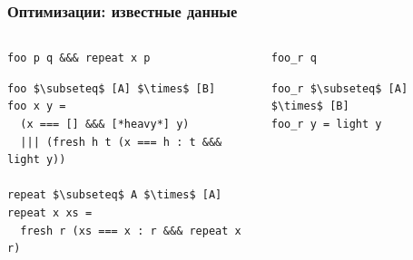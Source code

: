 \documentclass{beamer}
\begin{document}
\begin{frame}[fragile]
  \transwipe[direction=90]
  \frametitle{Оптимизации: известные данные}
\begin{columns}[t]
\begin{column}{7cm}
\begin{badcode}
\begin{lstlisting}[frame=single]      
foo p q &&& repeat x p
\end{lstlisting}

\begin{lstlisting}[frame=single]  
foo $\subseteq$ [A] $\times$ [B]
foo x y = 
  (x === [] &&& [*heavy*] y)
  ||| (fresh h t (x === h : t &&& light y))
      
repeat $\subseteq$ A $\times$ [A]
repeat x xs = 
  fresh r (xs === x : r &&& repeat x r)
\end{lstlisting}
\end{badcode}
\end{column}

\pause

\begin{column}{4cm}
\begin{goodcode}
\begin{lstlisting}[frame=single]  
foo_r q
\end{lstlisting}

\begin{lstlisting}[frame=single]  
foo_r $\subseteq$ [A] $\times$ [B]
foo_r y = light y
\end{lstlisting}
\end{goodcode}
\end{column}
\end{columns}
\end{frame}
\end{document}
